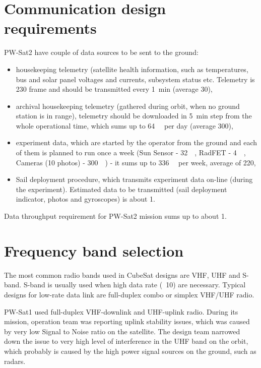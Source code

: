 \chapter{Communication design requirements}
PW-Sat2 have couple of data sources to be sent to the ground:
\begin{itemize}
    \item housekeeping telemetry (satellite health information, such as temperatures, bus and solar panel voltages and currents, subsystem status etc. Telemetry is \SI{230}{\byte} frame and should be transmitted every \SI{1}{\minute} (average \SI{30}{\bps}),
    \item archival housekeeping telemetry (gathered during orbit, when no ground station is in range), telemetry should be downloaded in \SI{5}{\minute} step from the whole operational time, which sums up to \SI{64}{\kilo\byte} per day (average \SI{300}{\bps}),
    \item experiment data, which are started by the operator from the ground and each of them is planned to run once a week (Sun Sensor -  \SI{32}{\kilo\byte}, RadFET - \SI{4}{\kilo\byte}, Cameras (10 photos) - \SI{300}{\kilo\byte}) - it sums up to \SI{336}{\kilo\byte} per week, average of \SI{220}{\bps},
    \item Sail deployment procedure, which transmits experiment data on-line (during the experiment). Estimated data to be transmitted (sail deployment indicator, photos and gyroscopes) is about \SI{1}{\kbps}.
\end{itemize}

Data throughput requirement for PW-Sat2 mission sums up to about \SI{1}{\kbps}.

\chapter{Frequency band selection}
The most common radio bands used in CubeSat designs are VHF, UHF and S-band. S-band is usually used when high data rate (~\SI{10}{\Mbps}) are necessary. Typical designs for low-rate data link are full-duplex combo or simplex VHF/UHF radio.

PW-Sat1 \cite{pwsat1_website_ska} used full-duplex VHF-downlink and UHF-uplink radio. During its mission, operation team was reporting uplink stability issues, which was caused by very low Signal to Noise ratio on the satellite. The design team narrowed down the issue to very high level of interference in the UHF band on the orbit, which probably is caused by the high power signal sources on the ground, such as radars.


